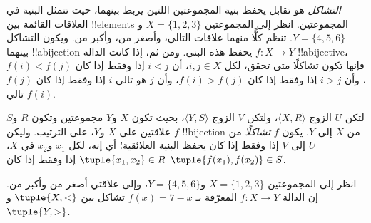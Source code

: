 \documentclass[../../../include/open-logic-section]{subfiles}
\begin{document}

\begin{explain}
\emph{التشاكل} هو تقابل يحفظ بنية المجموعتين اللتين يربط بينهما، حيث تتمثل
البنية في العلاقات القائمة بين !!{element}s المجموعتين. انظر إلى
المجموعتين $X=\{1,2,3\}$ و$Y=\{4,5,6\}$. تنظم كلًّا منهما علاقات
التالي، وأصغر من، وأكبر من. ويكون التشاكل بينهما !!a{bijection} يحفظ
هذه البنى. ومن ثم، إذا كانت الدالة $f \colon X \to Y$ !!a{bijective}،
فإنها تكون تشاكلًا متى تحقق، لكل $i,j\in X$، أن $i<j$ إذا وفقط إذا
كان $f(i)<f(j)$، وأن $i>j$ إذا وفقط إذا كان $f(i)>f(j)$، وأن $j$ هو
تالي $i$ إذا وفقط إذا كان $f(j)$ تالي $f(i)$.
\end{explain}

\begin{defn}[التشاكل]
لتكن $U$ الزوج $\langle X, R\rangle$، ولتكن $V$ الزوج $\langle
Y, S\rangle$، بحيث تكون $X$ و$Y$ مجموعتين وتكون $R$ و$S$ علاقتين
على $X$ و$Y$، على الترتيب. وليكن $f$ !!{bijection} من $X$ إلى
$Y$. يكون $f$ \emph{تشاكلًا} من $U$ إلى $V$ إذا وفقط إذا كان يحفظ
البنية العلائقية؛ أي إنه، لكل $x_{1}$ و$x_{2}$ في $X$،
$\tuple{x_1,x_2} \in R$ إذا وفقط إذا كان $\tuple{f(x_1),f(x_2)} \in S$.
\end{defn}

\begin{ex}
انظر إلى المجموعتين $X=\{1,2,3\}$ و$Y=\{4,5,6\}$، وإلى علاقتي
أصغر من وأكبر من. إن الدالة $f\colon X \to Y$ المعرّفة بـ
$f(x) = 7-x$ تشاكل بين $\tuple{X,<}$ و$\tuple{Y,>}$.
\end{ex}
\end{document}
